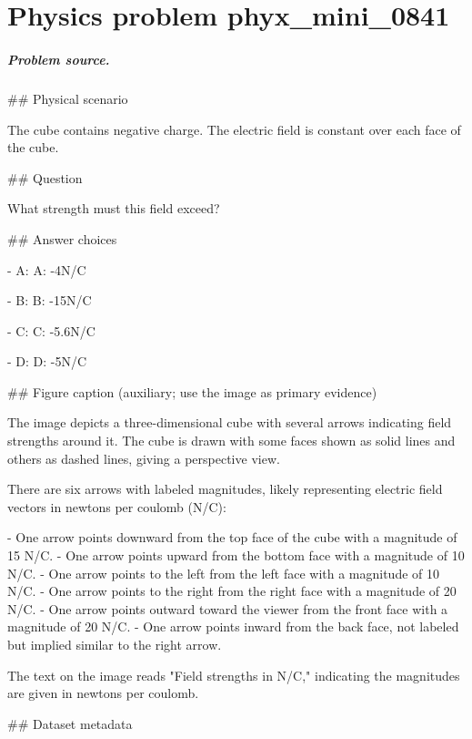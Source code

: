 
\chapter{Physics problem phyx\_mini\_0841}
\label{ch:PhyXMiniProblems_problem_phyx_mini_0841}

\paragraph{Problem source.}
\#\# Physical scenario

The cube contains negative charge. The electric field is constant over each face of the cube.

\#\# Question

What strength must this field exceed?

\#\# Answer choices

- A: A: -4N/C

- B: B: -15N/C

- C: C: -5.6N/C

- D: D: -5N/C

\#\# Figure caption (auxiliary; use the image as primary evidence)

The image depicts a three-dimensional cube with several arrows indicating field strengths around it. The cube is drawn with some faces shown as solid lines and others as dashed lines, giving a perspective view.

There are six arrows with labeled magnitudes, likely representing electric field vectors in newtons per coulomb (N/C):

- One arrow points downward from the top face of the cube with a magnitude of 15 N/C.
- One arrow points upward from the bottom face with a magnitude of 10 N/C.
- One arrow points to the left from the left face with a magnitude of 10 N/C.
- One arrow points to the right from the right face with a magnitude of 20 N/C.
- One arrow points outward toward the viewer from the front face with a magnitude of 20 N/C.
- One arrow points inward from the back face, not labeled but implied similar to the right arrow.

The text on the image reads "Field strengths in N/C," indicating the magnitudes are given in newtons per coulomb.

\#\# Dataset metadata

